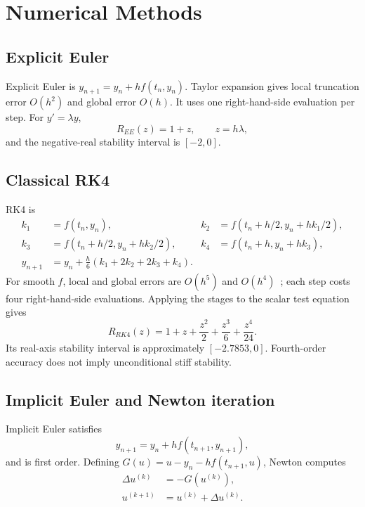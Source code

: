 \section{Numerical Methods}
\subsection{Explicit Euler}
Explicit Euler is $y_{n+1}=y_n+h f(t_n,y_n)$. Taylor expansion gives local truncation error $O(h^2)$ and global error $O(h)$. It uses one right-hand-side evaluation per step. For $y'=\lambda y$,
\[
R_{EE}(z)=1+z,\qquad z=h\lambda,
\]
and the negative-real stability interval is $[-2,0]$.

\subsection{Classical RK4}
RK4 is
\begin{align*}
k_1&=f(t_n,y_n),&k_2&=f(t_n+h/2,y_n+hk_1/2),\\
k_3&=f(t_n+h/2,y_n+hk_2/2),&k_4&=f(t_n+h,y_n+hk_3),\\
y_{n+1}&=y_n+\frac h6(k_1+2k_2+2k_3+k_4).
\end{align*}
For smooth $f$, local and global errors are $O(h^5)$ and $O(h^4)$~\cite{butcher}; each step costs four right-hand-side evaluations. Applying the stages to the scalar test equation gives
\[
R_{RK4}(z)=1+z+\frac{z^2}{2}+\frac{z^3}{6}+\frac{z^4}{24}.
\]
Its real-axis stability interval is approximately $[-2.7853,0]$. Fourth-order accuracy does not imply unconditional stiff stability.

\subsection{Implicit Euler and Newton iteration}
Implicit Euler satisfies
\[
y_{n+1}=y_n+h f(t_{n+1},y_{n+1}),
\]
and is first order. Defining $G(u)=u-y_n-hf(t_{n+1},u)$, Newton computes
\begin{align*}
[I-hJ_f(t_{n+1},u^{(k)})]\Delta u^{(k)}&=-G(u^{(k)}),\\
u^{(k+1)}&=u^{(k)}+\Delta u^{(k)}.
\end{align*}
